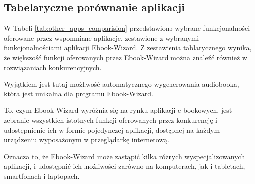 \subsection{Tabelaryczne porównanie aplikacji}

W Tabeli \ref{tab:other_apps_comparision} przedstawiono wybrane funkcjonalności oferowane przez wspomniane aplikacje, zestawione z wybranymi funkcjonalnościami aplikacji Ebook-Wizard. Z zestawienia tablarycznego wynika, że większość funkcji oferowanych przez Ebook-Wizard można znaleźć również w rozwiązaniach konkurencyjnych. 

Wyjątkiem jest tutaj możliwość automatycznego wygenerowania audiobooka, która jest unikalna dla programu Ebook-Wizard. 

To, czym Ebook-Wizard wyróżnia się na rynku aplikacji e-bookowych, jest zebranie wszystkich istotnych funkcji oferowanych przez konkurencję i udostępnienie ich w formie pojedynczej aplikacji, dostępnej na każdym urządzeniu wyposażonym w przeglądarkę internetową.

Oznacza to, że Ebook-Wizard może zastąpić kilka różnych wyspecjalizowanych aplikacji, i udostępnić ich możliwości zarówno na komputerach, jak i tabletach, smartfonach i laptopach.

